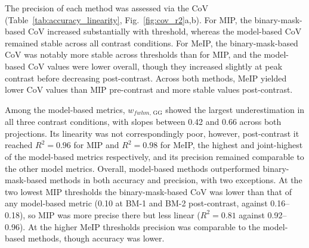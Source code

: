 The precision of each method was assessed via the CoV (Table~\ref{tab:accuracy_linearity}, Fig.~\ref{fig:cov_r2}a,b). For MIP, the binary-mask-based CoV increased substantially with threshold, whereas the model-based CoV remained stable across all contrast conditions. For MeIP, the binary-mask-based CoV was notably more stable across thresholds than for MIP, and the model-based CoV values were lower overall, though they increased slightly at peak contrast before decreasing post-contrast. Across both methods, MeIP yielded lower CoV values than MIP pre-contrast and more stable values post-contrast.

Among the model-based metrics, $w_{fwhm,\,\mathrm{GG}}$ showed the largest underestimation in all three contrast conditions, with slopes between 0.42 and 0.66 across both projections. Its linearity was not correspondingly poor, however, post-contrast it reached $R^2 = 0.96$ for MIP and $R^2 = 0.98$ for MeIP, the highest and joint-highest of the model-based metrics respectively, and its precision remained comparable to the other model metrics. Overall, model-based methods outperformed binary-mask-based methods in both accuracy and precision, with two exceptions. At the two lowest MIP thresholds the binary-mask-based CoV was lower than that of any model-based metric (0.10 at BM-1 and BM-2 post-contrast, against 0.16--0.18), so MIP was more precise there but less linear ($R^2 = 0.81$ against 0.92--0.96). At the higher MeIP thresholds precision was comparable to the model-based methods, though accuracy was lower.


